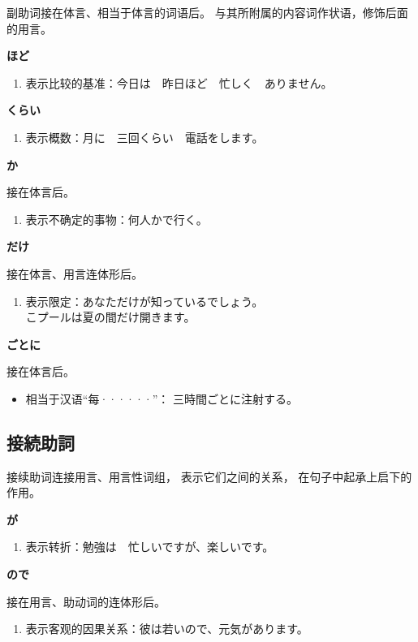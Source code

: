副助词接在体言、相当于体言的词语后。
与其所附属的内容词作状语，修饰后面的用言。

{\bf
\noindent ほど
}

\begin{enumerate}
  \item 表示比较的基准：今日は　昨日ほど　忙しく　ありません。
\end{enumerate}

{\bf
\noindent くらい 
}

\begin{enumerate}
  \item 表示概数：月に　三回くらい　電話をします。
\end{enumerate}

{\bf
\noindent か
}

接在体言后。
\begin{enumerate}
  \item 表示不确定的事物：何人かで行く。
\end{enumerate}

{\bf
\noindent だけ
}

接在体言、用言连体形后。
\begin{enumerate}
  \item 表示限定：あなただけが知っているでしょう。\\
    こプールは夏の間だけ開きます。
\end{enumerate}

{\bf
\noindent ごとに
}

接在体言后。
\begin{itemize}
  \item 相当于汉语``每······''： 三時間ごとに注射する。
\end{itemize}


\subsection{接続助詞}%

接续助词连接用言、用言性词组，
表示它们之间的关系，
在句子中起承上启下的作用。

{\bf
\noindent が
}

\begin{enumerate}
  \item 表示转折：勉強は　忙しいですが、楽しいです。
\end{enumerate}

{\bf
\noindent ので
}

接在用言、助动词的连体形后。
\begin{enumerate}
  \item 表示客观的因果关系：彼は若いので、元気があります。
\end{enumerate}

